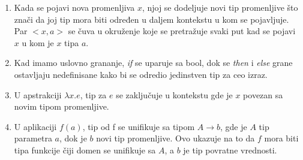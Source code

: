 \begin{enumerate}
	\item Kada se pojavi nova promenljiva $x$, njoj se dodeljuje novi tip promenljive što znači da joj tip mora biti određen u daljem kontekstu u kom se pojavljuje. Par $<x, a>$ se čuva u okruženje koje se pretražuje svaki put kad se pojavi $x$ u kom je $x$ tipa $a$.
	
	\item Kad imamo uslovno grananje, \textit{if} se uparuje sa bool, dok se \textit{then} i \textit{else} grane ostavljaju nedefinisane kako bi se odredio jedinstven tip za ceo izraz.
	
	\item U apstrakciji $\lambda x.e$, tip za $e$ se zaključuje u kontekstu gde je $x$ povezan sa novim tipom promenljive.
	
	\item U aplikaciji $f(a)$, tip od f se unifikuje sa tipom $A \longrightarrow b$, gde je $A$ tip parametra $a$, dok je $b$ novi tip promenljive. Ovo ukazuje na to da $f$ mora biti tipa funkcije čiji domen se unifikuje sa $A$, a $b$ je tip povratne vrednosti.
\end{enumerate}



